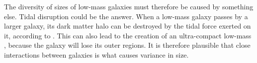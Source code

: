 The diversity of sizes of low-mass galaxies must therefore be caused by something else. Tidal disruption could be the answer. When a low-mass galaxy passes by a larger galaxy, its dark matter halo can be destroyed by the tidal force exerted on it, according to \cite{morenoGalaxiesLackingDark2022}. This can also lead to the creation of an ultra-compact low-mass \citep{applebaumUltrafaintDwarfsMilky2021}, because the galaxy will lose its outer regions. It is therefore plausible that close interactions between galaxies is what causes variance in size.

